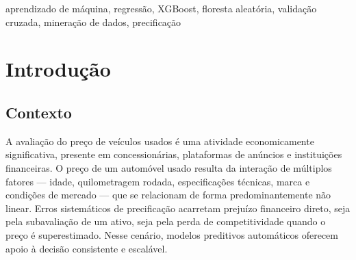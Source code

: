 \documentclass[conference]{IEEEtran}
\begin{document}
\begin{abstract}
A precificação de veículos usados é um problema de regressão de elevada relevância econômica, marcado por relações não lineares entre idade, quilometragem e especificações mecânicas. Neste trabalho, técnicas de aprendizado de máquina e mineração de dados foram aplicadas para prever o preço de venda de carros usados a partir de um conjunto de dados real do mercado indiano, composto por 8.128 anúncios. Após limpeza, engenharia de atributos e análise exploratória apoiada por Análise de Componentes Principais, o preço foi modelado em escala logarítmica e seis algoritmos foram comparados por validação cruzada de cinco dobras com partição agrupada pelo veículo, de modo a impedir vazamento de informação. Os métodos de comitê obtiveram o melhor desempenho; o XGBoost foi o mais acurado, com coeficiente de determinação de 0,916 no conjunto de teste e erro percentual absoluto médio de 16,2 por cento, superando de forma estatisticamente significativa o gradient boosting. A interpretação por permutação indicou que o ano do veículo, a potência e o torque são os preditores mais relevantes. Demonstra-se, assim, um fluxo metodológico completo, robusto e transferível para problemas tabulares de precificação.
\end{abstract}

\begin{IEEEkeywords}
aprendizado de máquina, regressão, XGBoost, floresta aleatória, validação cruzada, mineração de dados, precificação
\end{IEEEkeywords}

\section{Introdução}

\subsection{Contexto}
A avaliação do preço de veículos usados é uma atividade economicamente significativa, presente em concessionárias, plataformas de anúncios e instituições financeiras. O preço de um automóvel usado resulta da interação de múltiplos fatores --- idade, quilometragem rodada, especificações técnicas, marca e condições de mercado --- que se relacionam de forma predominantemente não linear. Erros sistemáticos de precificação acarretam prejuízo financeiro direto, seja pela subavaliação de um ativo, seja pela perda de competitividade quando o preço é superestimado. Nesse cenário, modelos preditivos automáticos oferecem apoio à decisão consistente e escalável.
\end{document}

